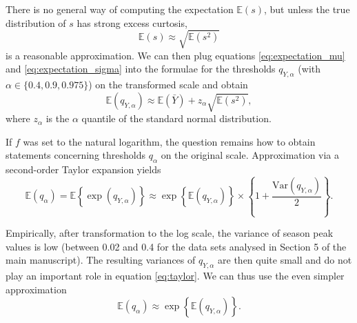 \documentclass{article}
\newcommand{\sd}{s}
\newcommand{\mean}{\bar{Y}}
\begin{document}
There is no general way of computing the expectation $\mathbb{E}(\sd)$, but unless the true distribution of  $\sd$ has strong excess curtosis,
\begin{equation}
\mathbb{E}(\sd) \approx \sqrt{\mathbb{E}(\sd^2)}
\label{eq:expectation_sigma}
\end{equation}
is a reasonable approximation. We can then plug equations \eqref{eq:expectation_mu} and \eqref{eq:expectation_sigma} into the formulae for the thresholds $q_{Y, \alpha}$ (with $\alpha \in \{0.4, 0.9, 0.975\}$) on the transformed scale and obtain
$$
\mathbb{E}(q_{Y, \alpha}) \approx \mathbb{E}(\mean) + z_\alpha \sqrt{\mathbb{E}(\sd^2)},
$$
where $z_\alpha$ is the $\alpha$ quantile of the standard normal distribution.

If $f$ was set to the natural logarithm, the question remains how to obtain statements concerning thresholds $q_\alpha$ on the original scale. Approximation via a second-order Taylor expansion yields
\begin{equation}
\mathbb{E}(q_\alpha) = \mathbb{E}\left\{\exp(q_{Y, \alpha})\right\} \approx \exp\left\{\mathbb{E}(q_{Y, \alpha})\right\} \times \left\{1 + \frac{\text{Var}(q_{Y, \alpha})}{2} \right\}.
\label{eq:taylor}
\end{equation}

Empirically, after transformation to the log scale, the variance of season peak values is low (between 0.02 and 0.4 for the data sets analysed in Section 5 of the main manuscript). The resulting variances of $q_{Y, \alpha}$ are then quite small and do not play an important role in equation \eqref{eq:taylor}. We can thus use the even simpler approximation
\begin{equation}
\mathbb{E}(q_\alpha) \approx \exp\left\{\mathbb{E}(q_{Y, \alpha})\right\}.
\end{equation}
\end{document}
